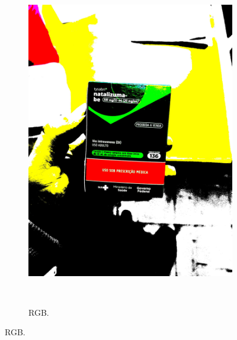 \begin{figure}[htb]
\begin{subfigure}[b]{0.21\textwidth}
        \includegraphics[width=\linewidth]{../pictures/tysabri_rgb_thresh_recomposed_cmyk.jpg}
    \end{subfigure}
    \\\vspace{\floatsep}
    \begin{subfigure}[b]{0.21\textwidth}
        \centering
        \caption{RGB.}
        \label{fig:foto:versoes:2:RGB:boxes}

\end{subfigure}
\end{figure}
